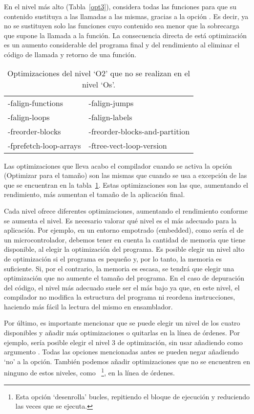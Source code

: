 En el nivel más alto (Tabla~\ref{opt3}),  considera todas las funciones para que su contenido sustituya a las llamadas a las mismas, gracias a la opción . Es decir, ya no se sustituyen solo las funciones cuyo contenido sea menor que la sobrecarga que supone la llamada a la función. La consecuencia directa de está optimización es un aumento considerable del programa final y del rendimiento al eliminar el código de llamada y retorno de una función. 

\begin{table}[htb]
\begin{center}
	\begin{tabular}{ll}
		-falign-functions & -falign-jumps\\
		-falign-loops & -falign-labels\\
		-freorder-blocks & -freorder-blocks-and-partition\\
		-fprefetch-loop-arrays & -ftree-vect-loop-version\\
\end{tabular}
\end{center}
\caption{Optimizaciones del nivel `O2' que no se realizan en el nivel `Os'.}
\label{opt_s}
\end{table}

Las optimizaciones que lleva acabo el compilador cuando se activa la opción  (Optimizar para el tamaño) son las mismas que cuando se usa  a excepción de las que se encuentran en la tabla~\ref{opt_s}. Estas optimizaciones son las que, aumentando el rendimiento, más aumentan el tamaño de la aplicación final.

Cada nivel ofrece diferentes optimizaciones, aumentando el rendimiento conforme se aumenta el nivel. Es necesario valorar qué nivel es el más adecuado para la aplicación. Por ejemplo, en un entorno empotrado (embedded), como sería el de un microcontrolador, debemos tener en cuenta la cantidad de memoria que tiene disponible, al elegir la optimización del programa. Es posible elegir un nivel alto de optimización si el programa es pequeño y, por lo tanto, la memoria es suficiente. Si, por el contrario, la memoria es escasa, se tendrá que elegir una optimización que no aumente el tamaño del programa. En el caso de depuración del código, el nivel más adecuado suele ser el más bajo ya que, en este nivel, el compilador no modifica la estructura del programa ni reordena instrucciones, haciendo más fácil la lectura del mismo en ensamblador.

Por último, es importante mencionar que se puede elegir un nivel de los cuatro disponibles y añadir más optimizaciones o quitarlas en la línea de órdenes. Por ejemplo, sería posible elegir el nivel 3 de optimización, sin usar  añadiendo como argumento . Todas las opciones mencionadas antes se pueden negar añadiendo `no' a la opción. También podemos añadir optimizaciones que no se encuentren en ninguno de estos niveles, como ~\footnote{Esta opción `desenrolla' bucles, repitiendo el bloque de ejecución y reduciendo las veces que se ejecuta.}, en la línea de órdenes.

